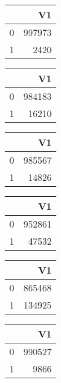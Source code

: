 \bigskip\bigskip
\centering
\begin{tabular}{rr}
  \hline
 & V1 \\ 
  \hline
0 & 997973 \\ 
  1 & 2420 \\ 
   \hline
\end{tabular}

\bigskip\bigskip
\centering
\begin{tabular}{rr}
  \hline
 & V1 \\ 
  \hline
0 & 984183 \\ 
  1 & 16210 \\ 
   \hline
\end{tabular}

\bigskip\bigskip
\centering
\begin{tabular}{rr}
  \hline
 & V1 \\ 
  \hline
0 & 985567 \\ 
  1 & 14826 \\ 
   \hline
\end{tabular}

\bigskip\bigskip
\centering
\begin{tabular}{rr}
  \hline
 & V1 \\ 
  \hline
0 & 952861 \\ 
  1 & 47532 \\ 
   \hline
\end{tabular}

\bigskip\bigskip
\centering
\begin{tabular}{rr}
  \hline
 & V1 \\ 
  \hline
0 & 865468 \\ 
  1 & 134925 \\ 
   \hline
\end{tabular}

\bigskip\bigskip
\centering
\begin{tabular}{rr}
  \hline
 & V1 \\ 
  \hline
0 & 990527 \\ 
  1 & 9866 \\ 
   \hline
\end{tabular}

